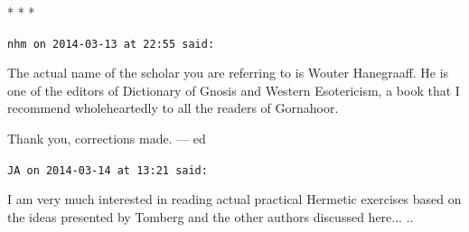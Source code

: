 
\begin{center}* * *\end{center}

\begin{footnotesize}
\begin{sffamily}
\texttt{nhm on 2014-03-13 at 22:55 said:}

The actual name of the scholar you are referring to is Wouter Hanegraaff. He is one of the editors of Dictionary of Gnosis and Western Esotericism, a book that I recommend wholeheartedly to all the readers of Gornahoor.

Thank you, corrections made. --- ed

\hfill

\texttt{JA on 2014-03-14 at 13:21 said:}

I am very much interested in reading actual practical Hermetic exercises based on the ideas presented by Tomberg and the other authors discussed here... ..

\end{sffamily}
\end{footnotesize}

